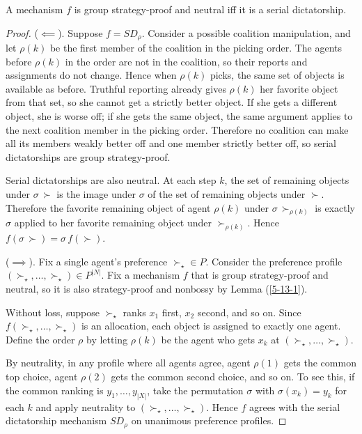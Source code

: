 \begin{theorem}[Svensson] \label{5-13-2}
	A mechanism $f$ is group strategy-proof and neutral iff it is a serial dictatorship.
\end{theorem}

\begin{proof}
	($\impliedby$). Suppose $f = SD_\rho$. Consider a possible coalition manipulation, and let $\rho(k)$ be the first member of the coalition in the picking order. The agents before $\rho(k)$ in the order are not in the coalition, so their reports and assignments do not change. Hence when $\rho(k)$ picks, the same set of objects is available as before. Truthful reporting already gives $\rho(k)$ her favorite object from that set, so she cannot get a strictly better object. If she gets a different object, she is worse off; if she gets the same object, the same argument applies to the next coalition member in the picking order. Therefore no coalition can make all its members weakly better off and one member strictly better off, so serial dictatorships are group strategy-proof.
	 
	Serial dictatorships are also neutral. At each step $k$, the set of remaining objects under $\sigma\,\succ$ is the image under $\sigma$ of the set of remaining objects under $\succ$. Therefore the favorite remaining object of agent $\rho(k)$ under $\sigma\,\succ_{\rho(k)}$ is exactly $\sigma$ applied to her favorite remaining object under $\succ_{\rho(k)}$. Hence $f(\sigma\, \succ) = \sigma\, f(\succ)$.

	($\implies$). Fix a single agent's preference $\succ_\star \in P$. Consider the preference profile $(\succ_\star, \ldots,\succ_\star) \in P^{\left| N \right|}$. Fix a mechanism $f$ that is group strategy-proof and neutral, so it is also strategy-proof and nonbossy by Lemma (\ref{5-13-1}).

	Without loss, suppose $\succ_\star$ ranks $x_1$ first, $x_2$ second, and so on. Since $f(\succ_\star,\ldots,\succ_\star)$ is an allocation, each object is assigned to exactly one agent. Define the order $\rho$ by letting $\rho(k)$ be the agent who gets $x_k$ at $(\succ_\star,\ldots,\succ_\star)$.

	By neutrality, in any profile where all agents agree, agent $\rho(1)$ gets the common top choice, agent $\rho(2)$ gets the common second choice, and so on. To see this, if the common ranking is $y_1,\ldots,y_{\left|X\right|}$, take the permutation $\sigma$ with $\sigma(x_k) = y_k$ for each $k$ and apply neutrality to $(\succ_\star,\ldots,\succ_\star)$.
	Hence $f$ agrees with the serial dictatorship mechanism $SD_\rho$ on unanimous preference profiles.


\end{proof}
